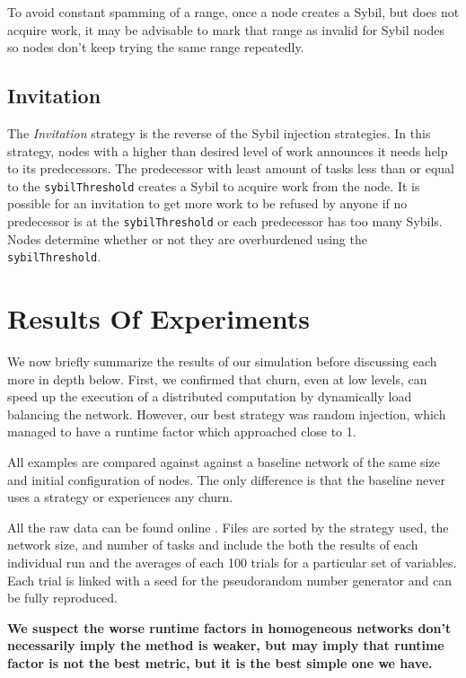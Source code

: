 To avoid constant spamming of a range, once a node creates a Sybil, but does not acquire work, it may be advisable to mark that range as invalid for Sybil nodes so nodes don't keep trying the same range repeatedly. 


\subsection{Invitation}
The \textit{Invitation} strategy is the reverse of the Sybil injection strategies.
In  this strategy, nodes with a higher than desired level of work announces it needs help to its predecessors.
The predecessor with least amount of tasks less than or equal to the \texttt{sybilThreshold} creates a Sybil to acquire work from the node.
It is possible for an invitation to get more work to be refused by anyone if no  predecessor is at the \texttt{sybilThreshold} or each predecessor has too many Sybils.
Nodes determine whether or not they are overburdened using the \texttt{sybilThreshold}.



\section{Results Of Experiments}
\label{sec:autonomous-results}

We now briefly summarize the results of our simulation before discussing each more in depth below.
First, we confirmed that churn, even at low levels, can speed up the execution of a distributed computation by dynamically load balancing the network.
However, our best strategy was random injection, which managed to have a runtime factor which approached close to 1.

All examples are compared against against a baseline network of the same size and initial configuration of nodes. 
The only difference is that the baseline never uses a strategy or experiences any churn.

All the raw data can be found online \cite{simulation-data}.
Files are sorted by the strategy used, the network size,  and number of tasks and include the both the results of each individual run and the averages of each 100 trials for a particular set of variables.
Each trial is linked with a seed for the pseudorandom number generator and can be fully reproduced.



\textbf{We suspect the worse runtime factors in homogeneous networks don't necessarily imply the method is weaker, but may imply that runtime factor is not the best metric, but it is the best simple one we have.}


